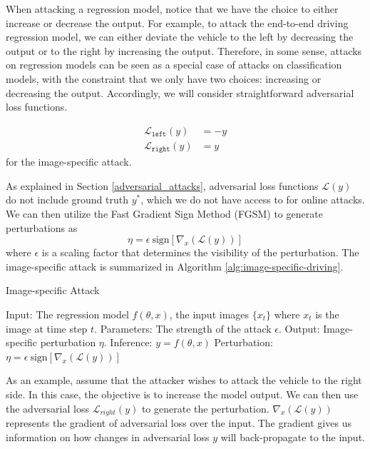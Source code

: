 When attacking a regression model, notice that we have the choice to either increase or decrease the output. For example, to attack the end-to-end driving regression model, we can either deviate the vehicle to the left by decreasing the output or to the right by increasing the output. Therefore, in some sense, attacks on regression models can be seen as a special case of attacks on classification models, with the constraint that we only have two choices: increasing or decreasing the output. Accordingly, we will consider straightforward adversarial loss functions. 

\begin{align}
    \mathcal{L}_{\texttt{left}}(y) &= -y \\
    \mathcal{L}_{\texttt{right}}(y) &= y
\end{align}
for the image-specific attack. 

As explained in Section \ref{adversarial_attacks}, adversarial loss functions $\mathcal{L}(y)$ do not include ground truth $y^{*}$, which we do not have access to for online attacks. We can then utilize the Fast Gradient Sign Method (FGSM) to generate perturbations as 
\begin{equation}
    \eta = \epsilon \ \text{sign}[\nabla_{x}( \mathcal{L}(y))]
\end{equation}
where $\epsilon$ is a scaling factor that determines the visibility of the perturbation. The image-specific attack is summarized in Algorithm \ref{alg:image-specific-driving}.

\begin{algorithm}[H]
    \caption{Image-specific Attack}\label{alg:image-specific-driving}
    \begin{algorithmic}
        \State Input: The regression model $f(\theta, x)$, the input images $\{x_t\}$ where $x_t$ is the image at time step $t$.
        \State Parameters: The strength of the attack $\epsilon$.
        \State Output: Image-specific perturbation $\eta$.
            \State Inference: $y = f(\theta, x)$
            \State Perturbation: $\eta = \epsilon \ \text{sign}[\nabla_{x}( \mathcal{L}(y))]$
        \EndFor
    \end{algorithmic}
\end{algorithm}

As an example, assume that the attacker wishes to attack the vehicle to the right side. In this case, the objective is to increase the model output. We can then use the adversarial loss $\mathcal{L}_{right}(y)$ to generate the perturbation. $\nabla_{x}( \mathcal{L}(y))$ represents the gradient of adversarial loss over the input. The gradient gives us information on how changes in adversarial loss $y$ will back-propagate to the input.

